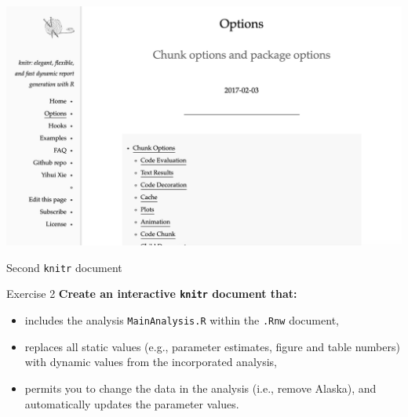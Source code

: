 \documentclass{beamer}\usepackage[]{graphicx}\usepackage[]{color}
\begin{document}
\begin{frame}
   \begin{center}
     \includegraphics[width=.9\linewidth]{chunkoptions}
   \end{center}
\end{frame}


\begin{frame}{Second \texttt{knitr} document}

\end{frame}

\begin{frame}[t]{Exercise 2}
\textbf{Create an interactive \texttt{knitr} document that:}
\begin{itemize}
\item includes the analysis \texttt{MainAnalysis.R} within the \texttt{.Rnw} document,
\item replaces all static values (e.g., parameter estimates, figure and table numbers) with dynamic values from the incorporated analysis,
\item permits you to change the data in the analysis (i.e., remove Alaska), and automatically updates the parameter values.
\end{itemize}
\end{frame}
\end{document}
